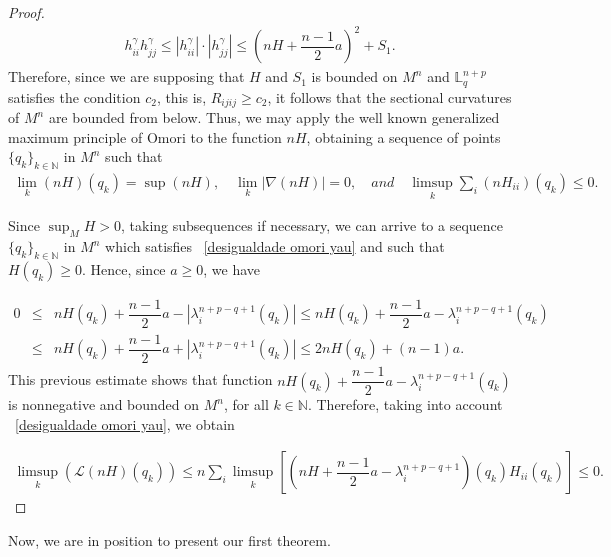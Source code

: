 \documentclass[leqno,11pt]{amsart}
\theoremstyle{plain}
\theoremstyle{definition}
\numberwithin{equation}{section}
\begin{document}
\begin{proof}
\begin{eqnarray*}
h_{ii}^{\gamma}h_{jj}^{\gamma}\leq |h_{ii}^{\gamma}|\cdot |h_{jj}^{\gamma}|\leq \left(nH+\dfrac{n-1}{2}a\right)^2+S_1.
\end{eqnarray*}
Therefore, since we are supposing that $H$ and $S_1$ is bounded on $M^n$ and $\mathbb{L}_{q}^{n+p}$ satisfies
the condition $c_2$, this is, $R_{ijij}\geq c_2$, it follows that the sectional curvatures of
$M^n$ are bounded from below.
Thus, we may apply the well known generalized
maximum principle of Omori \cite{omori} to the function $nH$, obtaining a sequence
of points $\{q_k\}_{k\in \mathbb{N}}$ in $M^n$
such that
\begin{eqnarray}\label{desigualdade omori yau}
\lim_{k}(nH)(q_k)=\sup(nH),\quad \lim_{k}|\nabla (nH)|=0,\quad and\quad \limsup_{k}\sum_{i}(nH_{ii})(q_k)\leq 0.
\end{eqnarray}

Since $\sup_{M}H>0$, taking subsequences if necessary, we can arrive to a sequence $\{q_k\}_{k\in \mathbb{N}}$ in $M^n$ which satisfies ~\eqref{desigualdade omori yau} and such that $H(q_k)\geq 0.$ Hence, since $a\geq 0$, we have

\begin{eqnarray*}
0&\leq& nH(q_k)+\dfrac{n-1}{2}a-|\lambda_{i}^{n+p-q+1}(q_k)|\leq nH(q_k)+\dfrac{n-1}{2}a-\lambda_{i}^{n+p-q+1}(q_k)\\
&\leq& nH(q_k)+\dfrac{n-1}{2}a+|\lambda_{i}^{n+p-q+1}(q_k)|\leq 2nH(q_k)+(n-1)a.
\end{eqnarray*}
This previous estimate shows that function $nH(q_k)+\dfrac{n-1}{2}a-\lambda_{i}^{n+p-q+1}(q_k)$
is nonnegative and bounded on $M^n$, for all $k\in \mathbb{N}.$
Therefore, taking into account ~\eqref{desigualdade omori yau},  we obtain

\begin{eqnarray*}
\limsup_{k}(\mathcal{L}(nH)(q_k))\leq n\sum_{i}\limsup_{k}\left[\left(nH+\dfrac{n-1}{2}a-\lambda_{i}^{n+p-q+1}\right)(q_k)H_{ii}(q_k)\right]\leq 0.
\end{eqnarray*}

\end{proof}


Now, we are in position to present our first theorem. 
\end{document}
